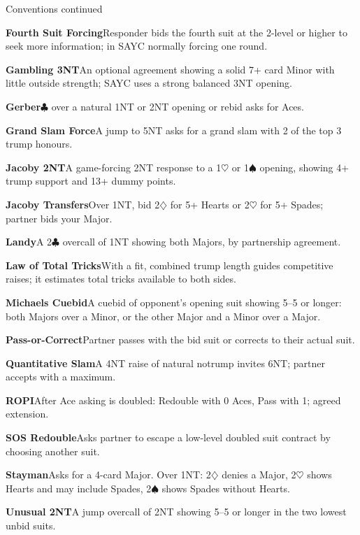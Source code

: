 \documentclass[10pt,letterpaper]{article}
\newcommand{\C}{\ensuremath{\clubsuit}}
\newcommand{\D}{\ensuremath{\diamondsuit}}
\newcommand{\Hh}{\ensuremath{\heartsuit}}
\renewcommand{\S}{\ensuremath{\spadesuit}}
\newcommand{\entry}[2]{\par\noindent\textbf{#1}\enspace #2\par\vspace{4.5pt}}
\begin{document}
\begin{minipage}[t]{0.485\textwidth}\vspace{0pt}

\begin{guidecard}{Conventions continued}
\entry{Fourth Suit Forcing}{Responder bids the fourth suit at the 2-level or higher to seek more information; in SAYC normally forcing one round.}
\entry{Gambling 3NT}{An optional agreement showing a solid 7+ card Minor with little outside strength; SAYC uses a strong balanced 3NT opening.}
\entry{Gerber}{4\C{} over a natural 1NT or 2NT opening or rebid asks for Aces.}
\entry{Grand Slam Force}{A jump to 5NT asks for a grand slam with 2 of the top 3 trump honours.}
\entry{Jacoby 2NT}{A game-forcing 2NT response to a 1\Hh{} or 1\S{} opening, showing 4+ trump support and 13+ dummy points.}
\entry{Jacoby Transfers}{Over 1NT, bid 2\D{} for 5+ Hearts or 2\Hh{} for 5+ Spades; partner bids your Major.}
\entry{Landy}{A 2\C{} overcall of 1NT showing both Majors, by partnership agreement.}
\entry{Law of Total Tricks}{With a fit, combined trump length guides competitive raises; it estimates total tricks available to both sides.}
\entry{Michaels Cuebid}{A cuebid of opponent's opening suit showing 5--5 or longer: both Majors over a Minor, or the other Major and a Minor over a Major.}
\entry{Pass-or-Correct}{Partner passes with the bid suit or corrects to their actual suit.}
\entry{Quantitative Slam}{A 4NT raise of natural notrump invites 6NT; partner accepts with a maximum.}
\entry{ROPI}{After Ace asking is doubled: Redouble with 0 Aces, Pass with 1; agreed extension.}
\entry{SOS Redouble}{Asks partner to escape a low-level doubled suit contract by choosing another suit.}
\entry{Stayman}{Asks for a 4-card Major. Over 1NT: 2\D{} denies a Major, 2\Hh{} shows Hearts and may include Spades, 2\S{} shows Spades without Hearts.}
\entry{Unusual 2NT}{A jump overcall of 2NT showing 5--5 or longer in the two lowest unbid suits.}
\end{guidecard}

\end{minipage}
\vfill{}
\end{document}
